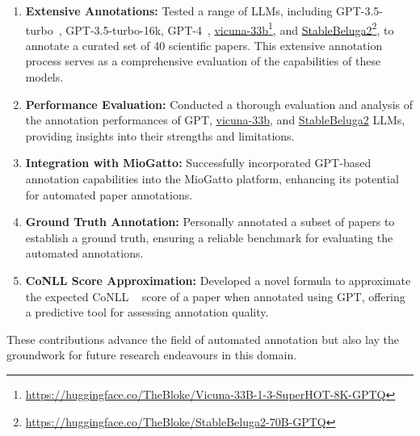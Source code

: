 \begin{enumerate}
    \item \textbf{Extensive Annotations:} Tested a range of LLMs, including GPT-3.5-turbo~\citep{openai2023}, GPT-3.5-turbo-16k, GPT-4~\citep{2303.08774}, \href{https://huggingface.co/TheBloke/Vicuna-33B-1-3-SuperHOT-8K-GPTQ}{vicuna-33b}\footnote{\url{https://huggingface.co/TheBloke/Vicuna-33B-1-3-SuperHOT-8K-GPTQ}}\citep{zheng2023judging}, and \href{https://huggingface.co/TheBloke/StableBeluga2-70B-GPTQ}{StableBeluga2}\footnote{\url{https://huggingface.co/TheBloke/StableBeluga2-70B-GPTQ}}\citep{StableBelugaModels, touvron2023llama, mukherjee2023orca}, to annotate a curated set of 40 scientific papers. This extensive annotation process serves as a comprehensive evaluation of the capabilities of these models.
    
    \item \textbf{Performance Evaluation:} Conducted a thorough evaluation and analysis of the annotation performances of GPT, \href{https://huggingface.co/TheBloke/Vicuna-33B-1-3-SuperHOT-8K-GPTQ}{vicuna-33b}, and \href{https://huggingface.co/TheBloke/StableBeluga2-70B-GPTQ}{StableBeluga2} LLMs, providing insights into their strengths and limitations.
    
    \item \textbf{Integration with MioGatto:} Successfully incorporated GPT-based annotation capabilities into the MioGatto platform, enhancing its potential for automated paper annotations.
    
    \item \textbf{Ground Truth Annotation:} Personally annotated a subset of papers to establish a ground truth, ensuring a reliable benchmark for evaluating the automated annotations.
    
    \item \textbf{CoNLL Score Approximation:} Developed a novel formula to approximate the expected CoNLL ~\citep{pradhan2012conll} score of a paper when annotated using GPT, offering a predictive tool for assessing annotation quality.
\end{enumerate}


These contributions advance the field of automated annotation but also lay the groundwork for future research endeavours in this domain.


